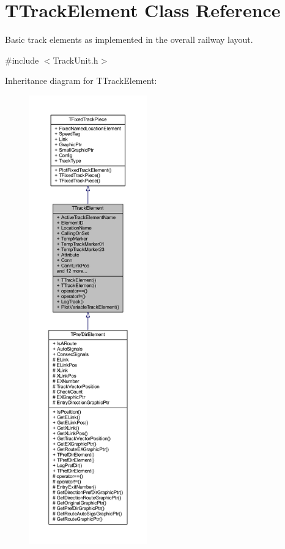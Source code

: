 \hypertarget{class_t_track_element}{}\section{T\+Track\+Element Class Reference}
\label{class_t_track_element}


Basic track elements as implemented in the overall railway layout.  




{\ttfamily \#include $<$Track\+Unit.\+h$>$}



Inheritance diagram for T\+Track\+Element\+:
\nopagebreak
\begin{figure}[H]
\begin{center}
\leavevmode
\includegraphics[height=550pt]{class_t_track_element__inherit__graph}
\end{center}
\end{figure}


